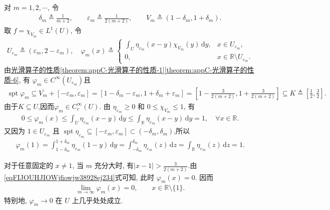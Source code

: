 \documentclass[../../main.tex]{subfiles}
\begin{document}
\begin{solution}
对 $m=1,2,\cdots$, 令
\begin{align*}
\delta_m\triangleq\frac{1}{m+2},\qquad
\varepsilon_m\triangleq\frac{1}{2(m+2)},\qquad
V_m\triangleq(1-\delta_m,1+\delta_m).
\end{align*}
取 $f=\chi_{V_m}\in L^1(U)$, 令
\begin{align*}
U_{\varepsilon_m}
\triangleq (\varepsilon_m,2-\varepsilon_m),\quad
\varphi_m(x)
\triangleq 
\begin{cases}
\int_U
\eta_{\varepsilon_m}(x-y)\chi_{V_m}(y)\,\mathrm{d}y,
& x\in U_{\varepsilon_m},\\
0, & x\in\mathbb{R}\setminus U_{\varepsilon_m}.
\end{cases}
\end{align*}
由\hyperref[theorem:appC-光滑算子的性质]{光滑算子的性质\ref{theorem:appC-光滑算子的性质-1}\ref{theorem:appC-光滑算子的性质-6}}, 有
$\varphi_m\in C^\infty(U_{\varepsilon_m})$且
\begin{align}\label{eqFIJOUHJIOWjfiowjw38928ej234}
\operatorname{spt}\varphi_m
\subseteq
\overline{V_m}+[-\varepsilon_m,\varepsilon_m]
=[1-\delta_m-\varepsilon_m,1+\delta_m+\varepsilon_m]=\left[1-\frac{3}{2(m+2)},1+\frac{3}{2(m+2)}\right]\subseteq K\triangleq\left[\frac12,\frac32\right].
\end{align}
由于$K\subseteq U$,因而$\varphi_m\in C_c^\infty(U).$
由 $\eta_{\varepsilon_m}\geqslant0$ 和
$0\leqslant\chi_{V_m}\leqslant1$, 有
\begin{align*}
0\leqslant\varphi_m(x)
\leqslant\int_U\eta_{\varepsilon_m}(x-y)\,\mathrm{d}y
\leqslant\int_{\mathbb{R}}
\eta_{\varepsilon_m}(x-y)\,\mathrm{d}y
=1,\quad \forall x\in\mathbb{R}.
\end{align*}
又因为 $1\in U_{\varepsilon_m}$ 且
$\operatorname{spt}\eta_{\varepsilon_m}
\subseteq[-\varepsilon_m,\varepsilon_m]
\subset(-\delta_m,\delta_m)$,所以
\begin{align*}
\varphi_m(1)
=\int_{1-\delta_m}^{1+\delta_m}
\eta_{\varepsilon_m}(1-y)\,\mathrm{d}y
=\int_{-\delta_m}^{\delta_m}
\eta_{\varepsilon_m}(z)\,\mathrm{d}z
=\int_{\mathbb{R}}\eta_{\varepsilon_m}(z)\,\mathrm{d}z
=1.
\end{align*}

对于任意固定的 $x\neq1$, 当 $m$ 充分大时, 有$|x-1|>\frac{3}{2(m+2)}.$由\eqref{eqFIJOUHJIOWjfiowjw38928ej234}式可知, 此时 $\varphi_m(x)=0$. 因而
\begin{align}\label{eqJIOUJFIOIOW82u582382380234824890}
\lim\limits_{m\to\infty}\varphi_m(x)=0,
\qquad x\in\mathbb{R}\setminus\{1\}.
\end{align}
特别地, $\varphi_m\to0$ 在 $U$ 上几乎处处成立.


\end{solution}
\end{document}
